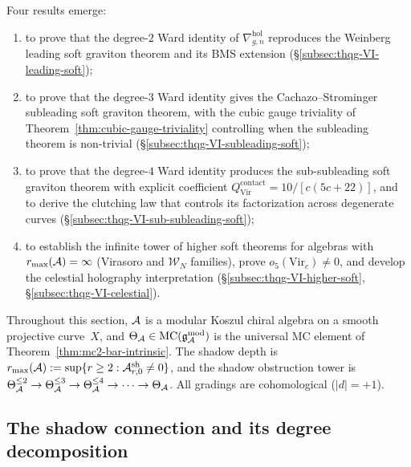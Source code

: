 Four results emerge:
\begin{enumerate}[label=\textup{(\arabic*)}]
\item to prove that the degree-$2$ Ward identity of
 $\nabla^{\mathrm{hol}}_{g,n}$ reproduces the Weinberg leading soft
 graviton theorem and its BMS extension
 (\S\ref{subsec:thqg-VI-leading-soft});
\item to prove that the degree-$3$ Ward identity gives the
 Cachazo--Strominger subleading soft graviton theorem, with the cubic
 gauge triviality of Theorem~\ref{thm:cubic-gauge-triviality}
 controlling when the subleading theorem is non-trivial
 (\S\ref{subsec:thqg-VI-subleading-soft});
\item to prove that the degree-$4$ Ward identity produces the
 sub-subleading soft graviton theorem with explicit coefficient
 $Q^{\mathrm{contact}}_{\mathrm{Vir}} = 10/[c(5c+22)]$, and to
 derive the clutching law that controls its factorization across
 degenerate curves
 (\S\ref{subsec:thqg-VI-sub-subleading-soft});
\item to establish the infinite tower of higher soft theorems for
 algebras with $r_{\max}(\mathcal{A}) = \infty$ (Virasoro and $\mathcal{W}_N$
 families), prove $o_5(\mathrm{Vir}_c) \neq 0$, and develop the
 celestial holography interpretation
 (\S\ref{subsec:thqg-VI-higher-soft},
 \S\ref{subsec:thqg-VI-celestial}).
\end{enumerate}

Throughout this section, $\mathcal{A}$ is a modular Koszul chiral algebra on a
smooth projective curve~$X$, and $\Theta_{\mathcal{A}} \in \text{MC}(\mathfrak{g}_{\mathcal{A}}^{\mathrm{mod}})$ is the
universal MC element of
Theorem~\ref{thm:mc2-bar-intrinsic}. The shadow depth is
$r_{\max}(\mathcal{A}) := \sup\{r \geq 2 : \mathcal{A}^{\mathrm{sh}}_{r,0} \neq 0\}$,
and the shadow obstruction tower is
$\Theta_{\mathcal{A}}^{\leq 2} \to \Theta_{\mathcal{A}}^{\leq 3} \to
\Theta_{\mathcal{A}}^{\leq 4} \to \cdots \to \Theta_{\mathcal{A}}$.
All gradings are cohomological ($|d| = +1$).

%
%

\subsection{The shadow connection and its degree decomposition}
\label{subsec:thqg-VI-shadow-connection}

